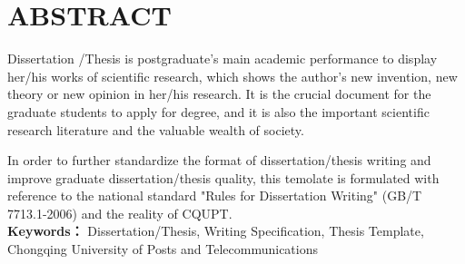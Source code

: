 



\chapter{ABSTRACT}

Dissertation /Thesis is postgraduate’s main academic performance to display her/his works of scientific research, which shows the author’s new invention, new theory or new opinion in her/his research. It is the crucial document for the graduate students to apply for degree, and it is also the important scientific research literature and the valuable wealth of society.

In order to further standardize the format of dissertation/thesis writing and improve graduate dissertation/thesis quality, this temolate is formulated with reference to the national standard "Rules for Dissertation Writing" (GB/T 7713.1-2006) and the reality of CQUPT.
\\

\noindent\textbf{Keywords：} Dissertation/Thesis, Writing Specification, Thesis Template, Chongqing University of Posts and Telecommunications

\clearpage